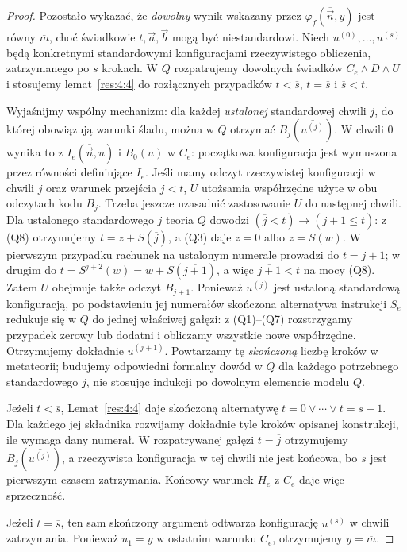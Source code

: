 \begin{proof}
Pozostało wykazać, że \emph{dowolny} wynik wskazany przez
$\varphi_f(\overline{\vec n},y)$ jest równy $\overline m$,
choć świadkowie $t,\vec a,\vec b$ mogą być niestandardowi.
Niech $u^{(0)},\ldots,u^{(s)}$ będą konkretnymi standardowymi
konfiguracjami rzeczywistego obliczenia, zatrzymanego po
$s$ krokach. W $Q$ rozpatrujemy dowolnych świadków
$C_e\land D\land U$ i stosujemy lemat~\ref{res:4:4}
do rozłącznych przypadków $t<\overline s$,
$t=\overline s$ i $\overline s<t$.

Wyjaśnijmy wspólny mechanizm: dla każdej \emph{ustalonej}
standardowej chwili $j$, do której obowiązują warunki śladu,
można w $Q$ otrzymać $B_j(\overline{u^{(j)}})$. W chwili $0$
wynika to z $I_e(\overline{\vec n},u)$ i $B_0(u)$
w $C_e$: początkowa konfiguracja jest wymuszona przez
równości definiujące $I_e$. Jeśli mamy odczyt rzeczywistej
konfiguracji w chwili $j$ oraz warunek przejścia $\overline j<t$,
$U$ utożsamia współrzędne użyte w obu odczytach kodu
$B_j$. Trzeba jeszcze uzasadnić zastosowanie $U$ do
następnej chwili. Dla ustalonego standardowego $j$ teoria $Q$
dowodzi $(\overline j<t)\to(\overline{j+1}\le t)$:
z (Q8) otrzymujemy $t=z+S(\overline j)$, a (Q3)
daje $z=0$ albo $z=S(w)$. W pierwszym przypadku
rachunek na ustalonym numerale prowadzi do
$t=\overline{j+1}$; w drugim do
$t=S^{j+2}(w)=w+S(\overline{j+1})$, a więc
$\overline{j+1}<t$ na mocy (Q8). Zatem $U$ obejmuje
także odczyt $B_{j+1}$. Ponieważ $u^{(j)}$ jest ustaloną
standardową konfiguracją, po podstawieniu jej numerałów
skończona alternatywa instrukcji $S_e$ redukuje się w $Q$
do jednej właściwej gałęzi: z (Q1)--(Q7) rozstrzygamy
przypadek zerowy lub dodatni i obliczamy wszystkie
nowe współrzędne. Otrzymujemy dokładnie
$u^{(j+1)}$. Powtarzamy tę \emph{skończoną} liczbę kroków
w metateorii; budujemy odpowiedni formalny dowód w $Q$
dla każdego potrzebnego standardowego $j$, nie stosując
indukcji po dowolnym elemencie modelu $Q$.

Jeżeli $t<\overline s$, Lemat~\ref{res:4:4} daje skończoną
alternatywę $t=\overline0\lor\cdots\lor t=\overline{s-1}$.
Dla każdego jej składnika rozwijamy dokładnie tyle kroków
opisanej konstrukcji, ile wymaga dany numerał. W rozpatrywanej gałęzi $t=\overline j$ otrzymujemy
$B_j(\overline{u^{(j)}})$, a rzeczywista konfiguracja w tej chwili
nie jest końcowa, bo $s$ jest pierwszym czasem zatrzymania.
Końcowy warunek $H_e$ z $C_e$ daje więc sprzeczność.

Jeżeli $t=\overline s$, ten sam skończony argument odtwarza
konfigurację $\overline{u^{(s)}}$ w chwili zatrzymania. Ponieważ
$u_1=y$ w ostatnim warunku $C_e$, otrzymujemy
$y=\overline m$.


\end{proof}

